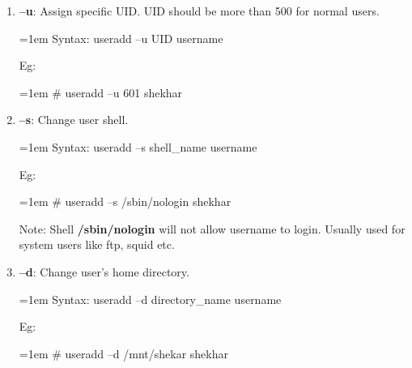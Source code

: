 \begin{flushleft}
\begin{enumerate}[label=(\alph*)]
		
		\item \textbf{–u}: Assign specific UID. UID should be more than 500 for normal users.
		\bigskip
		\begin{tcolorbox}[breakable,notitle,boxrule=0pt,colback=pink,colframe=pink]
			\color{black}
			\font=1em
			Syntax: useradd –u UID username
			\font=4pt
		\end{tcolorbox}
		Eg:
		\bigskip
		\begin{tcolorbox}[breakable,notitle,boxrule=-0pt,colback=black,colframe=black]
			\color{green}
			\font=1em
			\# useradd –u 601 shekhar
			\font=4pt
		\end{tcolorbox}
		
		
		\item \textbf{–s}: Change user shell.
		\bigskip
		\begin{tcolorbox}[breakable,notitle,boxrule=0pt,colback=pink,colframe=pink]
			\color{black}
			\font=1em
			Syntax: useradd –s shell\_name username
			\font=4pt
		\end{tcolorbox}
		Eg:
		\bigskip
		\begin{tcolorbox}[breakable,notitle,boxrule=-0pt,colback=black,colframe=black]
			\color{green}
			\font=1em
			\# useradd –s /sbin/nologin shekhar
			\font=4pt
		\end{tcolorbox}
		\bigskip
		\begin{tcolorbox}[breakable,notitle,boxrule=-0pt,colback=yellow,colframe=yellow]
			\color{black}
			Note: Shell \textbf{/sbin/nologin} will not allow username to login. Usually used for system users like ftp, squid etc.
		\end{tcolorbox}
		
		
		\item \textbf{–d}: Change user's home directory.
		\bigskip
		\begin{tcolorbox}[breakable,notitle,boxrule=0pt,colback=pink,colframe=pink]
			\color{black}
			\font=1em
			Syntax: useradd –d directory\_name username
			\font=4pt
		\end{tcolorbox}
		Eg:
		\bigskip
		\begin{tcolorbox}[breakable,notitle,boxrule=-0pt,colback=black,colframe=black]
			\color{green}
			\font=1em
			\# useradd –d /mnt/shekar shekhar 
			\font=4pt
		\end{tcolorbox}
	\end{enumerate}
	
	\bigskip
	\bigskip
	

\end{flushleft}
